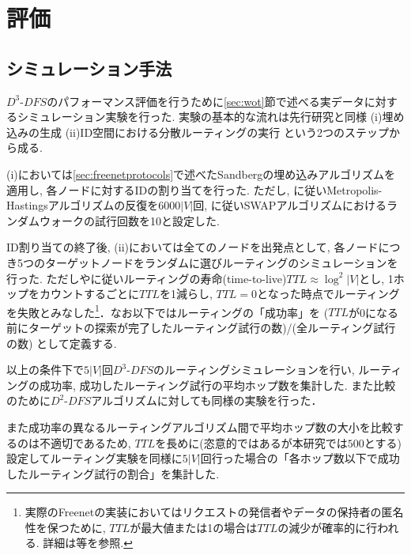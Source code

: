 \documentclass[technicalreport]{./ieicej-v3.0/UTF/ieicej}
\begin{document}
 \section{評価} \label{sec:evaluation}
  \subsection{シミュレーション手法}
  $D^3$-$DFS$のパフォーマンス評価を行うために\ref{sec:wot}節で述べる実データに対するシミュレーション実験を行った. 実験の基本的な流れは先行研究と同様 (i)埋め込みの生成 (ii)ID空間における分散ルーティングの実行 という2つのステップから成る.

  (i)においては\ref{sec:freenetprotocols}で述べたSandbergの埋め込みアルゴリズムを適用し, 各ノードに対するIDの割り当てを行った. ただし, \cite{sandberg2006distributed}に従いMetropolis-Hastingsアルゴリズムの反復を$6000|V|$回, \cite{roos2016analyzing}に従いSWAPアルゴリズムにおけるランダムウォークの試行回数を10と設定した.

  ID割り当ての終了後, (ii)においては全てのノードを出発点として, 各ノードにつき5つのターゲットノードをランダムに選びルーティングのシミュレーションを行った. ただし\cite{sandberg2006distributed}や\cite{schiller2011attack}に従いルーティングの寿命(time-to-live)$TTL\approx \log^2|V|$とし, 1ホップをカウントするごとに$TTL$を1減らし, $TTL=0$となった時点でルーティングを失敗とみなした\footnote{実際のFreenetの実装においてはリクエストの発信者やデータの保持者の匿名性を保つために, $TTL$が最大値または1の場合は$TTL$の減少が確率的に行われる. 詳細は\cite{roos2016analyzing}等を参照.}．なお以下ではルーティングの「成功率」を ($TTL$が0になる前にターゲットの探索が完了したルーティング試行の数)/(全ルーティング試行の数) として定義する.

  以上の条件下で$5|V|$回$D^3$-$DFS$のルーティングシミュレーションを行い, ルーティングの成功率, 成功したルーティング試行の平均ホップ数を集計した. また比較のために$D^2$-$DFS$アルゴリズムに対しても同様の実験を行った．

  また成功率の異なるルーティングアルゴリズム間で平均ホップ数の大小を比較するのは不適切であるため, $TTL$を長めに(恣意的ではあるが本研究では$500$とする)設定してルーティング実験を同様に$5|V|$回行った場合の「各ホップ数以下で成功したルーティング試行の割合」を集計した.
\end{document}
